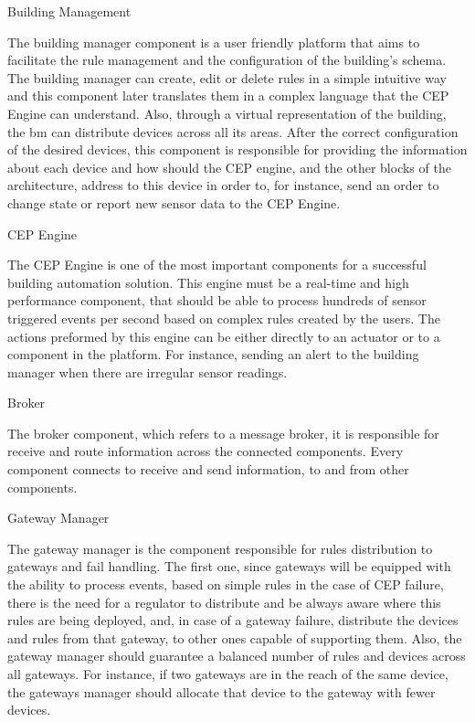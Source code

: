 \begin{Paragraph}{Building Management}
	
	The building manager component is a user friendly platform that aims to facilitate the rule management and the configuration of the building's schema. The building manager can create, edit  or delete rules in a simple intuitive way and this component later translates them in a complex language that the CEP Engine can understand. Also, through a virtual representation of the building, the \ac{bm} can distribute devices across all its areas. After the correct configuration of the desired devices, this component is responsible for providing the information about each device and how should the CEP engine, and the other blocks of the architecture, address to this device in order to, for instance, send an order to change state or report new sensor data to the CEP Engine.
	
\end{Paragraph}

\begin{Paragraph}{CEP Engine}
	
	The CEP Engine is one of the most important components for a successful building automation solution. This engine must be a real-time and high performance component, that should be able to process hundreds of sensor triggered events per second based on complex rules created by the users. The actions preformed by this engine can be either directly to an actuator or to a component in the platform. For instance, sending an alert to the building manager when there are irregular sensor readings.
	
	
\end{Paragraph}

\begin{Paragraph}{Broker}
	
	The broker component, which refers to a message broker, it is responsible for receive and route information across the connected components. Every component connects to receive and send information, to and from other components.
	
\end{Paragraph}

\begin{Paragraph}{Gateway Manager}
	
	The gateway manager is the component responsible for rules distribution to gateways and fail handling. The first one, since gateways will be equipped with the ability to process events, based on simple rules in the case of CEP failure, there is the need for a regulator to distribute and be always aware where this rules are being deployed, and, in case of a gateway failure, distribute the devices and rules from that gateway, to other ones capable of supporting them. Also, the gateway manager should guarantee a balanced number of rules and devices across all gateways. For instance, if two gateways are in the reach of the same device, the gateways manager should allocate that device to the gateway with fewer devices.
	
	
\end{Paragraph}

